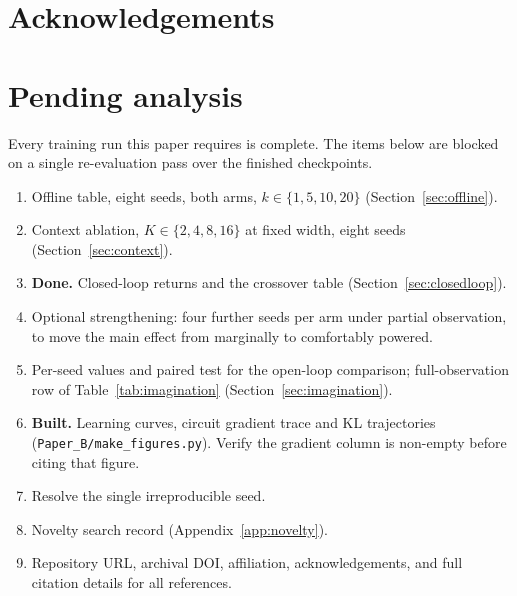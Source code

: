 \documentclass[11pt,onecolumn]{article}
\newif\ifdraft
\newcommand{\pend}[1]{%
  \ifdraft\textcolor{PendFG}{\textbf{[}\textit{#1}\textbf{]}}\fi}
\begin{document}
\section*{Acknowledgements}
\pend{acknowledgements, funding, hardware access}

\appendix
\section{Pending analysis}\label{app:remaining}
Every training run this paper requires is complete. The items below are
blocked on a single re-evaluation pass over the finished checkpoints.

\begin{enumerate}\itemsep3pt
\item Offline table, eight seeds, both arms, $k \in \{1,5,10,20\}$
      (Section~\ref{sec:offline}).
\item Context ablation, $K \in \{2,4,8,16\}$ at fixed width, eight seeds
      (Section~\ref{sec:context}).
\item \textbf{Done.} Closed-loop returns and the crossover table
      (Section~\ref{sec:closedloop}).
\item Optional strengthening: four further seeds per arm under partial
      observation, to move the main effect from marginally to
      comfortably powered.
\item Per-seed values and paired test for the open-loop comparison;
      full-observation row of Table~\ref{tab:imagination}
      (Section~\ref{sec:imagination}).
\item \textbf{Built.} Learning curves, circuit gradient trace and
      KL trajectories (\texttt{Paper\_B/make\_figures.py}). Verify the
      gradient column is non-empty before citing that figure.
\item Resolve the single irreproducible seed.
\item Novelty search record (Appendix~\ref{app:novelty}).
\item Repository URL, archival DOI, affiliation, acknowledgements, and
      full citation details for all references.
\end{enumerate}

\end{document}
